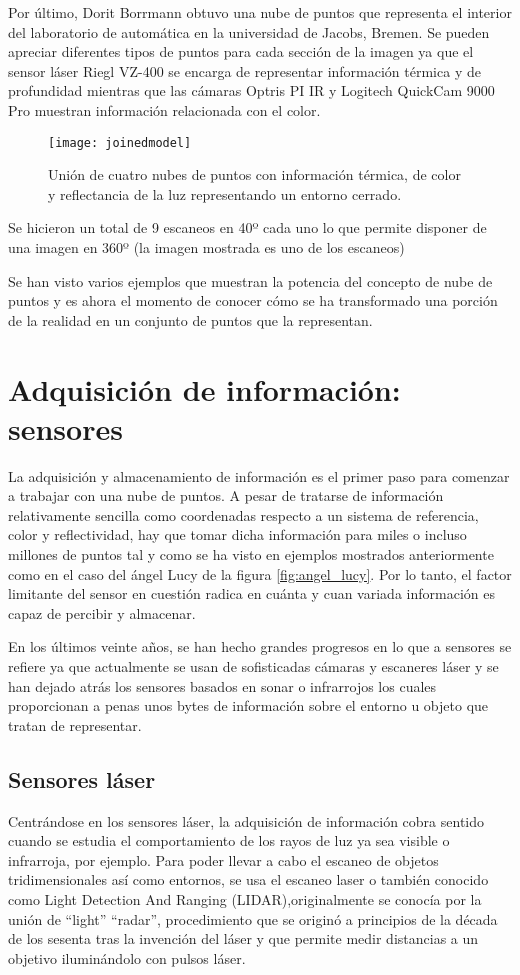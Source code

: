 Por último, Dorit Borrmann obtuvo una nube de puntos\cite{pcd_exteriores} que representa el interior del laboratorio de automática en la universidad de Jacobs, Bremen. Se pueden apreciar diferentes tipos de puntos para cada sección de la imagen ya que el sensor láser Riegl VZ-400 se encarga de representar información térmica y de profundidad mientras que las cámaras Optris PI IR y Logitech QuickCam 9000 Pro muestran información relacionada con el color.

\begin{figure}
\centering
\texttt{[image: joinedmodel]}
\caption{Unión de cuatro nubes de puntos con información térmica, de color y reflectancia de la luz representando un entorno cerrado.}\label{fig:joined_model}
\end{figure}

Se hicieron un total de 9 escaneos en 40º cada uno lo que permite disponer de una imagen en 360º (la imagen mostrada es uno de los escaneos)

Se han visto varios ejemplos que muestran la potencia del concepto de nube de puntos y es ahora el momento de conocer cómo se ha transformado una porción de la realidad en un conjunto de puntos que la representan.


\section{Adquisición de información: sensores}
La adquisición y almacenamiento de información es el primer paso para comenzar a trabajar con una nube de puntos. A pesar de tratarse de información relativamente sencilla como coordenadas respecto a un sistema de referencia, color y reflectividad, hay que tomar dicha información para miles o incluso millones de puntos tal y como se ha visto en ejemplos mostrados anteriormente como en el caso del ángel Lucy de la figura \ref{fig:angel_lucy}. Por lo tanto, el factor limitante del sensor en cuestión radica en cuánta y cuan variada información es capaz de percibir y almacenar.

En los últimos veinte años, se han hecho grandes progresos en lo que a sensores se refiere ya que actualmente se usan de sofisticadas cámaras y escaneres láser y se han dejado atrás los sensores basados en sonar o infrarrojos los cuales proporcionan a penas unos bytes de información sobre el entorno u objeto que tratan de representar.

\subsection{Sensores láser}
Centrándose en los sensores láser, la adquisición de información cobra sentido cuando se estudia el comportamiento de los rayos de luz ya sea visible o infrarroja, por ejemplo. Para poder llevar a cabo el escaneo de objetos tridimensionales así como entornos, se usa el escaneo laser o también conocido como Light Detection And Ranging (LIDAR),originalmente se conocía por la unión de ``light'' ``radar'', 
procedimiento que se originó a principios de la década de los sesenta tras la invención del láser y que permite medir distancias a un objetivo iluminándolo con pulsos láser.

